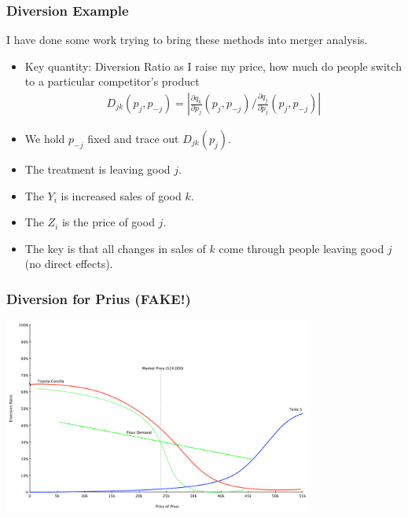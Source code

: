 \documentclass[xcolor=pdftex,dvipsnames,table,mathserif]{beamer}
\begin{document}
\begin{frame}
\frametitle{Diversion Example}
I have done some work trying to bring these methods into merger analysis.
\begin{itemize}
\item Key quantity: \alert{Diversion Ratio} as I raise my price, how much do people switch to a particular competitor's product
\begin{eqnarray*}
D_{jk}(p_j,p_{-j}) = \left| \frac{\partial q_k}{\partial p_j}(p_j,p_{-j}) /  \frac{\partial q_j}{\partial p_j}(p_j,p_{-j}) \right|
\end{eqnarray*}
\item We hold $p_{-j}$ fixed and trace out $D_{jk}(p_j)$.
\item The \alert{treatment} is leaving good $j$.
\item The $Y_i$ is increased sales of good $k$.
\item The $Z_i$ is the price of good $j$.
\item The key is that all changes in sales of $k$ come through people leaving good $j$ (no direct effects).
\end{itemize}
\end{frame}

\begin{frame}
\frametitle{Diversion for Prius (FAKE!)}
\begin{center}
\includegraphics[width=4in]{./resources/sillydiversion.pdf}
\end{center}
\end{frame}
\end{document}
